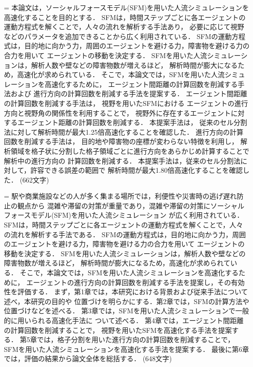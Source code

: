 
={
本論文は，ソーシャルフォースモデル(SFM)を用いた人流シミュレーションを高速化することを目的とする．
SFMは，時間ステップごとに各エージェントの運動方程式を解くことで，人々の流れを解析する手法あり，
必要に応じて視野などのパラメータを追加できることから広く利用されている．
SFMの運動方程式は，目的地に向かう力，周囲のエージェントを避ける力，障害物を避ける力の合力を用いて
エージェントの移動を決定する．
SFMを用いた人流シミュレーションは，解析人数や壁などの障害物数が増えるほど，
解析時間が膨大になるため，高速化が求められている．
そこで，本論文では，SFMを用いた人流シミュレーションを高速化するために，
エージェント間距離の計算回数を削減する手法および
進行方向の計算回数を削減する手法を提案する．
%
エージェント間距離の計算回数を削減する手法は，
視野を用いたSFMにおける
エージェントの進行方向と視野角の関係性を利用することで，
視野外に存在するエージェントに対するエージェント距離の計算回数を削減する．
本提案手法は，
従来のセル分割法に対して解析時間が最大1.25倍高速化することを確認した．
%
進行方向の計算回数を削減する手法は，
目的地や障害物の座標が変わらない特徴を利用し，
解析領域を格子状に分割した格子領域ごとに進行方向をあらかじめ計算することで解析中の進行方向の
計算回数を削減する．
本提案手法は，従来のセル分割法に対して，許容できる誤差の範囲で
解析時間が最大1.80倍高速化することを確認した．
(662文字)
}

={
駅や商業施設などの人が多く集まる場所では，利便性や災害時の逃げ遅れ防止の観点から
混雑や滞留の対策が重量であり，混雑や滞留の対策にソーシャルフォースモデル(SFM)を用いた人流シミュレーション
が広く利用されている．
SFMは，時間ステップごとに各エージェントの運動方程式を解くことで，人々の流れを解析する手法である．
SFMの運動方程式は，目的地に向かう力，周囲のエージェントを避ける力，障害物を避ける力の合力を用いて
エージェントの移動を決定する．
SFMを用いた人流シミュレーションは，解析人数や壁などの障害物数が増えるほど，
解析時間が膨大になるため，高速化が求められている．
そこで，本論文では，SFMを用いた人流シミュレーションを高速化するために，
エージェントの進行方向の計算回数を削減する手法を提案し，その有効性を評価する．
まず，第1章では，本研究における背景および従来手法について述べ，本研究の目的や
位置づけを明らかにする．第2章では，SFMの計算方法や位置づけなどを述べる．
第3章では，SFMを用いた人流シミュレーションで一般的に用いられる高速化手法に
ついて述べる．
第4章では，エージェント間距離の計算回数を削減することで，
視野を用いたSFMを高速化する手法を提案する．
第5章では，格子分割を用いた進行方向の計算回数を削減することで，
SFMを用いた人流シミュレーションを高速化する手法を提案する．
最後に第6章では，評価の結果から論文全体を総括する．
(648文字)
}

